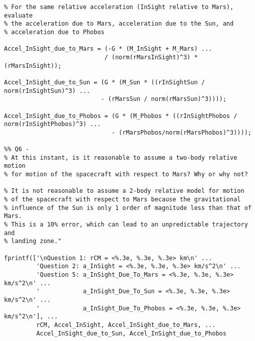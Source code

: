 \begin{lstlisting}[frame=lines,style=Matlab-editor,basicstyle = \mlttfamily]
%% Q5 -
% For the same relative acceleration (InSight relative to Mars), evaluate
% the acceleration due to Mars, acceleration due to the Sun, and
% acceleration due to Phobos

Accel_InSight_due_to_Mars = (-G * (M_InSight + M_Mars) ...
                            / (norm(rMarsInSight)^3) * (rMarsInSight));

Accel_InSight_due_to_Sun = (G * (M_Sun * ((rInSightSun / norm(rInSightSun)^3) ...
                           - (rMarsSun / norm(rMarsSun)^3))));

Accel_InSight_due_to_Phobos = (G * (M_Phobos * ((rInSightPhobos / norm(rInSightPhobos)^3) ...
                              - (rMarsPhobos/norm(rMarsPhobos)^3))));

%% Q6 -
% At this instant, is it reasonable to assume a two-body relative motion
% for motion of the spacecraft with respect to Mars? Why or why not?

% It is not reasonable to assume a 2-body relative model for motion
% of the spacecraft with respect to Mars because the gravitational
% influence of the Sun is only 1 order of magnitude less than that of Mars.
% This is a 10% error, which can lead to an unpredictable trajectory and
% landing zone."

fprintf(['\nQuestion 1: rCM = <%.3e, %.3e, %.3e> km\n' ...
         'Question 2: a_InSight = <%.3e, %.3e, %.3e> km/s^2\n' ...
         'Question 5: a_InSight_Due_To_Mars = <%.3e, %.3e, %.3e> km/s^2\n' ...
         '            a_InSight_Due_To_Sun = <%.3e, %.3e, %.3e> km/s^2\n' ...
         '            a_InSight_Due_To_Phobos = <%.3e, %.3e, %.3e> km/s^2\n'], ...
         rCM, Accel_InSight, Accel_InSight_due_to_Mars, ...
         Accel_InSight_due_to_Sun, Accel_InSight_due_to_Phobos
\end{lstlisting}
